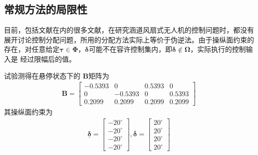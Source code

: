 \subsection{常规方法的局限性}
目前，包括文献\parencite{Ahmadi_2011,Aruneshwaran_2013a,Binetti_2007,Chen_2019,Emami_2018,Fan_2018,Hassanalian_2017,Hess_2008,Johnson_2005,Lipera_2001,Manzoor_2020,Naldi_2010,Ohanian_2010,Ohanian_2012,Peddle_2009,Pflimlin_2006,Pflimlin_2007,Pflimlin_2007a,Sharifzadeh_2019,Sheng_2015,Straub_2016,Zhao_2008,Zhao_2015}在内的很多文献，在研究涵道风扇式无人机的控制问题时，都没有展开讨论控制分配问题，所用的分配方法实际上等价于伪逆法。由于操纵面约束的存在，对任意给定$\bm{\tau} \in \bm{\Phi} $，$ \bm{\delta} $可能不在容许控制集内，即$\bm{\delta } \notin \bm{\Omega} $，实际执行的控制输入是 经过限幅后的值。

试验测得在悬停状态下的 $ \bm{B} $矩阵为
\begin{align}\bm{B}=\left[\begin{array}{cccc}
-0.5393 & 0 & 0.5393 & 0 \\
0 & -0.5393 & 0 & 0.5393 \\
0.2099 & 0.2099 & 0.2099 & 0.2099
\end{array}\right]	\label{control_effectiveness_matrix}
\end{align}
其操纵面约束为
\begin{align}\underline{\bm{\delta}}=\left[\begin{array}{l}
-20^{\circ} \\
-20^{\circ} \\
-20^{\circ} \\
-20^{\circ}
\end{array}\right], \overline{\bm{\delta}}=\left[\begin{array}{c}
20^{\circ} \\
20^{\circ} \\
20^{\circ} \\
20^{\circ}
\end{array}\right]	\label{position_constraints}
\end{align}

